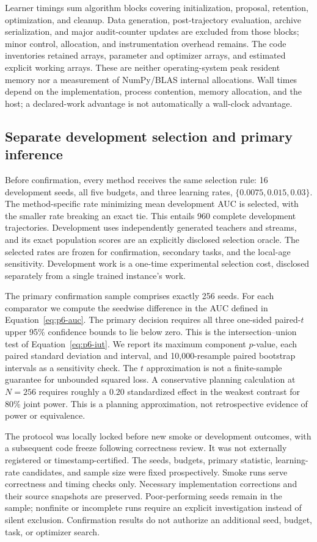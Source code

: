 \documentclass[10pt]{article}
\begin{document}
Learner timings sum algorithm blocks covering initialization, proposal,
retention, optimization, and cleanup. Data generation, post-trajectory
evaluation, archive serialization, and major audit-counter updates
are excluded from those blocks; minor control, allocation, and
instrumentation overhead remains. The code inventories retained arrays,
parameter and optimizer arrays, and estimated explicit working
arrays. These are neither operating-system peak resident memory nor
a measurement of NumPy/BLAS internal allocations. Wall times depend
on the implementation, process contention, memory allocation, and
the host; a declared-work advantage is not automatically a
wall-clock advantage.

\subsection{Separate development selection and primary inference}

Before confirmation, every method receives the same selection rule:
16 development seeds, all five budgets, and three learning rates,
$\{0.0075,0.015,0.03\}$. The method-specific rate minimizing mean
development AUC is selected, with the smaller rate breaking an exact
tie. This entails 960 complete development trajectories. Development
uses independently generated teachers and streams, and its exact
population scores are an explicitly disclosed selection oracle.
The selected rates are frozen for confirmation, secondary tasks,
and the local-age sensitivity. Development work is a one-time
experimental selection cost, disclosed separately from a single
trained instance's work.

The primary confirmation sample comprises exactly 256 seeds. For each
comparator we compute the seedwise difference in the AUC defined in
Equation~\eqref{eq:p6-auc}. The primary decision requires all three
one-sided paired-$t$ upper 95\% confidence bounds to lie below zero.
This is the intersection--union test of
Equation~\eqref{eq:p6-iut}. We report its maximum component $p$-value,
each paired standard deviation and interval, and 10,000-resample
paired bootstrap intervals as a sensitivity check. The $t$
approximation is not a finite-sample guarantee for unbounded
squared loss. A conservative planning calculation at $N=256$
requires roughly a $0.20$ standardized effect in the weakest
contrast for 80\% joint power. This is a planning approximation,
not retrospective evidence of power or equivalence.

The protocol was locally locked before new smoke or development
outcomes, with a subsequent code freeze following correctness review.
It was not externally registered or timestamp-certified. The seeds,
budgets, primary statistic, learning-rate candidates, and sample size
were fixed prospectively. Smoke runs serve correctness and timing
checks only. Necessary implementation corrections and their source
snapshots are preserved. Poor-performing seeds remain in the sample;
nonfinite or incomplete runs require an explicit investigation
instead of silent exclusion. Confirmation results do not authorize
an additional seed, budget, task, or optimizer search.
\end{document}
